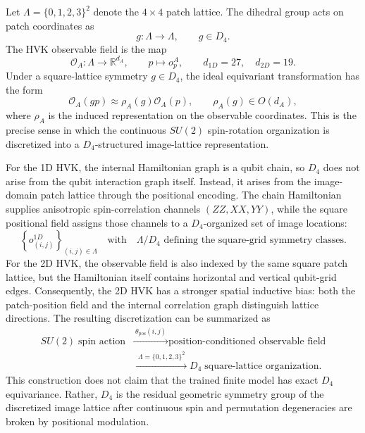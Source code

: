 \documentclass[11pt]{article}
\begin{document}
Let $\Lambda=\{0,1,2,3\}^2$ denote the $4\times4$ patch lattice. The dihedral group acts on patch coordinates as
\begin{equation}
g:\Lambda\rightarrow\Lambda,
\qquad g\in D_4.
\end{equation}
The HVK observable field is the map
\begin{equation}
\mathcal{O}_A:\Lambda\rightarrow\mathbb{R}^{d_A},
\qquad
p\mapsto o_p^A,
\qquad
d_{1D}=27,\quad d_{2D}=19.
\end{equation}
Under a square-lattice symmetry $g\in D_4$, the ideal equivariant transformation has the form
\begin{equation}
\mathcal{O}_A(gp)
\approx
\rho_A(g)\mathcal{O}_A(p),
\qquad
\rho_A(g)\in O(d_A),
\end{equation}
where $\rho_A$ is the induced representation on the observable coordinates. This is the precise sense in which the continuous $SU(2)$ spin-rotation organization is discretized into a $D_4$-structured image-lattice representation.

For the 1D HVK, the internal Hamiltonian graph is a qubit chain, so $D_4$ does not arise from the qubit interaction graph itself. Instead, it arises from the image-domain patch lattice through the positional encoding. The chain Hamiltonian supplies anisotropic spin-correlation channels $(ZZ,XX,YY)$, while the square positional field assigns those channels to a $D_4$-organized set of image locations:
\begin{equation}
\left\{
o_{(i,j)}^{1D}
\right\}_{(i,j)\in\Lambda}
\quad\text{with}\quad
\Lambda/D_4
\text{ defining the square-grid symmetry classes.}
\end{equation}
For the 2D HVK, the observable field is also indexed by the same square patch lattice, but the Hamiltonian itself contains horizontal and vertical qubit-grid edges. Consequently, the 2D HVK has a stronger spatial inductive bias: both the patch-position field and the internal correlation graph distinguish lattice directions. The resulting discretization can be summarized as
\begin{align}
SU(2)\;\text{spin action}
&\xrightarrow{\;\theta_{\mathrm{pos}}(i,j)\;}
\text{position-conditioned observable field}
\nonumber\\
&\xrightarrow{\;\Lambda=\{0,1,2,3\}^2\;}
D_4\;\text{square-lattice organization}.
\end{align}
This construction does not claim that the trained finite model has exact $D_4$ equivariance. Rather, $D_4$ is the residual geometric symmetry group of the discretized image lattice after continuous spin and permutation degeneracies are broken by positional modulation.
\end{document}
